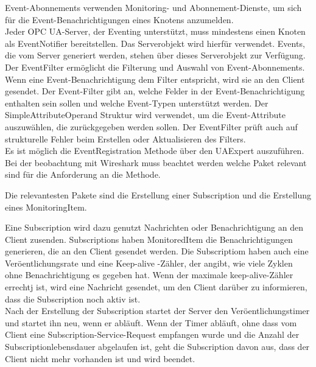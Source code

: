 Event-Abonnements verwenden Monitoring- und Abonnement-Dienste, um sich für die Event-Benachrichtigungen eines Knotens anzumelden.\\

Jeder OPC UA-Server, der Eventing unterstützt, muss mindestens einen Knoten als EventNotifier bereitstellen. Das Serverobjekt wird hierfür verwendet. Events, die vom Server generiert werden, stehen über dieses Serverobjekt zur Verfügung.\\


Der EventFilter ermöglicht die Filterung und Auswahl von Event-Abonnements.
Wenn eine Event-Benachrichtigung dem Filter entspricht, wird sie an den Client gesendet. Der Event-Filter gibt an, welche Felder in der Event-Benachrichtigung
enthalten sein sollen und welche Event-Typen unterstützt werden. Der SimpleAttributeOperand Struktur wird verwendet, um die Event-Attribute auszuwählen, die zurückgegeben werden sollen.  Der EventFilter prüft auch auf strukturelle Fehler beim Erstellen oder Aktualisieren des
Filters.\\


Es ist möglich die EventRegistration Methode über den UAExpert auszuführen. Bei der beobachtung mit Wireshark muss beachtet werden welche Paket relevant sind für die Anforderung an die Methode.



Die relevantesten Pakete sind die Erstellung einer Subscription und die Erstellung eines MonitoringItem.


Eine Subscription wird dazu genutzt Nachrichten oder Benachrichtigung an
den Client zusenden. Subscriptions haben MonitoredItem die Benachrichtigungen generieren, die an den Client gesendet werden. Die Subscriptiom haben auch eine Veröentlichungsrate und eine Keep-alive -Zähler, der angibt,
wie viele Zyklen ohne Benachrichtigung es gegeben hat. Wenn der maximale
keep-alive-Zähler errechtj ist, wird eine Nachricht gesendet, um den Client
darüber zu informieren, dass die Subscription noch aktiv ist.\\
Nach der Erstellung der Subscription startet der Server den Veröentlichungstimer und startet ihn neu, wenn er abläuft. Wenn der Timer abläuft,
ohne dass vom Client eine Subscription-Service-Request empfangen wurde
und die Anzahl der Subscriptionlebensdauer abgelaufen ist, geht die Subscription davon aus, dass der Client nicht mehr vorhanden ist und wird beendet.\\

